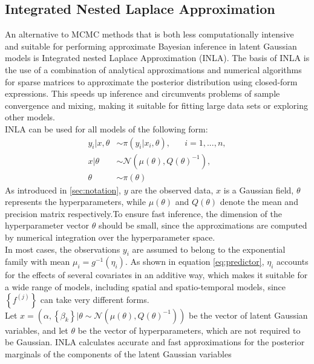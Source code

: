 \documentclass[12pt]{book}
\begin{document}
\subsection{Integrated Nested Laplace Approximation}
An alternative to MCMC methods that is both less computationally intensive and suitable for performing approximate Bayesian inference in latent Gaussian models is Integrated nested Laplace Approximation (INLA). The basis of INLA is the use of a combination of analytical approximations and numerical algorithms for sparse matrices to approximate the posterior distribution using closed-form expressions. This speeds up inference and circumvents problems of sample convergence and mixing, making it suitable for fitting large data sets or exploring other models.  \\
INLA can be used for all models of the following form:
\begin{align*}
    y_i|x,\theta &\sim \pi\left(y_i|x_i,\theta\right), \hspace{20pt} i=1,...,n,\\
    x|\theta &\sim \mathcal{N}\left(\mu\left(\theta\right), Q\left(\theta\right)^{-1}\right), \\
    \theta &\sim \pi\left(\theta\right)
\end{align*}
As introduced in \autoref{sec:notation}, $y$ are the observed data, $x$ is a Gaussian field, $\theta$ represents the hyperparameters, while $\mu\left(\theta\right)$ and $Q\left(\theta\right)$ denote the mean and precision matrix respectively.To ensure fast inference, the dimension of the hyperparameter vector $\theta$ should be small, since the approximations are computed by numerical integration over the hyperparameter space. \\
In most cases, the observations $y_i$ are assumed to belong to the exponential family with mean $\mu_i=g^{-1}\left(\eta_i\right)$. As shown in equation \eqref{eq:predictor}, $\eta_i$ accounts for the effects of several covariates in an additive way, which makes it suitable for a wide range of models, including spatial and spatio-temporal models, since $\left\lbrace f^{(j)}\right\rbrace$ can take very different forms. \\
Let $x=\left(\alpha,\left\lbrace\beta_k\right\rbrace|\theta\sim\mathcal{N}\left(\mu\left(\theta\right), Q\left(\theta\right)^{-1}\right)\right)$ be the vector of latent Gaussian variables, and let $\theta$ be the vector of hyperparameters, which are not required to be Gaussian. INLA calculates accurate and fast approximations for the posterior marginals of the components of the latent Gaussian variables
\end{document}
